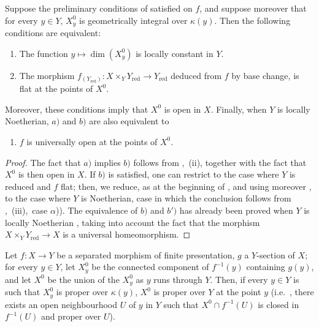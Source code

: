\begin{corollary}[15.6.7]
\label{IV.15.6.7}
Suppose the preliminary conditions of  satisfied on $f$, and suppose moreover that for every $y\in Y$, $X_y^0$ is geometrically integral over $\kappa(y)$.
Then the following conditions are equivalent:
\begin{enumerate}[label=\emph{\alph*)}]
  \item The function $y\mapsto\dim(X_y^0)$ is locally constant in $Y$.
  \item The morphism $f_{(Y_\mathrm{red})}:X\times_Y Y_\mathrm{red}\to Y_\mathrm{red}$ deduced from $f$ by base change, is flat at the points of $X^0$.
\end{enumerate}
Moreover, these conditions imply that $X^0$ is open in $X$.
Finally, when $Y$ is locally Noetherian, $a)$ and $b)$ are also equivalent to
\begin{enumerate}
  \item[\rm b$'$)] $f$ is universally open at the points of $X^0$.
\end{enumerate}
\end{corollary}

\begin{proof}
The fact that $a)$ implies $b)$ follows from ,~(ii), together with the fact that $X^0$ is then open in $X$.
If $b)$ is satisfied, one can restrict to the case where $Y$ is reduced and $f$ flat; then, we reduce, as at the beginning of , and using moreover , to the case where $Y$ is Noetherian, case in which the conclusion follows from ,~(iii),~case $\alpha$)).
The equivalence of $b)$ and $b')$ has already been proved when $Y$ is locally Noetherian , taking into account the fact that the morphism $X\times_Y Y_\mathrm{red}\to X$ is a universal homeomorphism.
\end{proof}

\begin{proposition}[15.6.8]
\label{IV.15.6.8}
Let $f:X\to Y$ be a separated morphism of finite presentation, $g$ a $Y$-section of $X$; for every $y\in Y$, let $X_y^0$ be the connected component of $f^{-1}(y)$ containing $g(y)$, and let $X^0$ be the union of the $X_y^0$ as $y$ runs through $Y$.
Then, if every $y\in Y$ is such that $X_y^0$ is proper over $\kappa(y)$, $X^0$ is proper over $Y$ at the point $y$ (i.e.\ , there exists an open neighbourhood $U$ of $y$ in $Y$ such that $X^0\cap f^{-1}(U)$ is closed in $f^{-1}(U)$ and proper over $U$).
\end{proposition}

